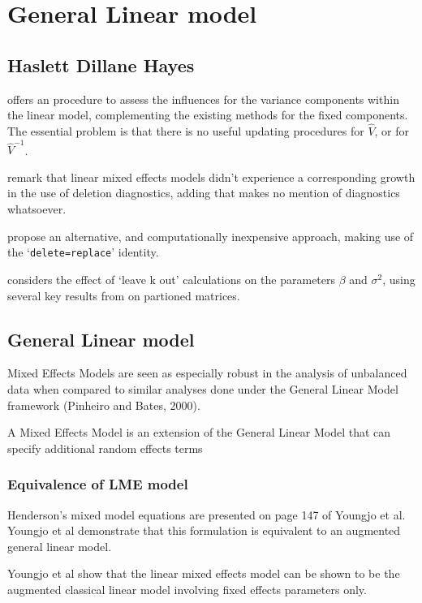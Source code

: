 \documentclass[Main.tex]{subfiles}
\begin{document}
\chapter{General Linear model}
\section{Haslett Dillane Hayes}
\citet{HaslettDillane} offers an procedure to assess the influences for the variance components
within the linear model, complementing the existing methods for the fixed components. The essential problem is that there is no useful updating procedures for $\hat{V}$, or for $\hat{V}^{-1}$.

\citet{HaslettDillane} remark that linear mixed effects models
didn't experience a corresponding growth in the use of deletion
diagnostics, adding that \citet{McCullSearle} makes no mention of
diagnostics whatsoever.	

\citet{HaslettDillane} propose an alternative, and
computationally inexpensive approach, making use of the
`\texttt{delete=replace}' identity.

\citet{Haslett99} considers the effect of `leave k out'
calculations on the parameters $\beta$ and $\sigma^{2}$, using
several key results from \citet{HaslettHayes} on partioned
matrices.
\section{General Linear model} Mixed Effects Models are seen as
especially robust in the analysis of unbalanced data when compared
to similar analyses done under the General Linear Model framework
(Pinheiro and Bates, 2000).

A Mixed Effects Model is an extension of the General Linear Model
that can specify additional random effects terms




\subsection{Equivalence of LME model}
Henderson's mixed model equations are presented on page 147 of
Youngjo et al. Youngjo et al demonstrate that this formulation is
equivalent to an augmented general linear model.

Youngjo et al show that the linear mixed effects model can be
shown to be the augmented classical linear model involving fixed
effects parameters only.
\end{document}
